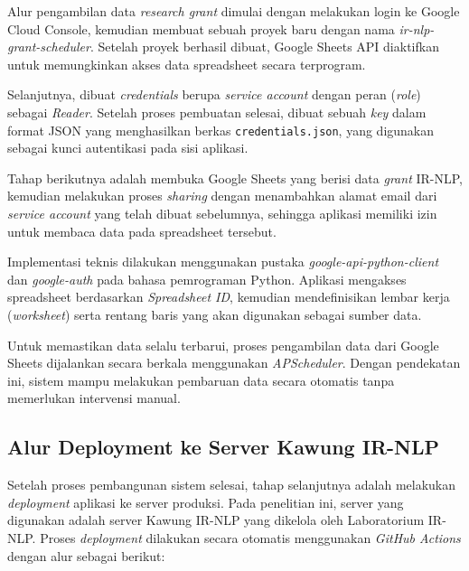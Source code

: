 Alur pengambilan data \textit{research grant} dimulai dengan melakukan login ke Google Cloud Console, kemudian membuat sebuah proyek baru dengan nama \textit{ir-nlp-grant-scheduler}. Setelah proyek berhasil dibuat, Google Sheets API diaktifkan untuk memungkinkan akses data spreadsheet secara terprogram.

Selanjutnya, dibuat \textit{credentials} berupa \textit{service account} dengan peran (\textit{role}) sebagai \textit{Reader}. Setelah proses pembuatan selesai, dibuat sebuah \textit{key} dalam format JSON yang menghasilkan berkas \texttt{credentials.json}, yang digunakan sebagai kunci autentikasi pada sisi aplikasi.

Tahap berikutnya adalah membuka Google Sheets yang berisi data \textit{grant} IR-NLP, kemudian melakukan proses \textit{sharing} dengan menambahkan alamat email dari \textit{service account} yang telah dibuat sebelumnya, sehingga aplikasi memiliki izin untuk membaca data pada spreadsheet tersebut.

Implementasi teknis dilakukan menggunakan pustaka \textit{google-api-python-client} dan \textit{google-auth} pada bahasa pemrograman Python. Aplikasi mengakses spreadsheet berdasarkan \textit{Spreadsheet ID}, kemudian mendefinisikan lembar kerja (\textit{worksheet}) serta rentang baris yang akan digunakan sebagai sumber data.

Untuk memastikan data selalu terbarui, proses pengambilan data dari Google Sheets dijalankan secara berkala menggunakan \textit{APScheduler}. Dengan pendekatan ini, sistem mampu melakukan pembaruan data secara otomatis tanpa memerlukan intervensi manual.


\subsection{Alur Deployment ke Server Kawung IR-NLP}

Setelah proses pembangunan sistem selesai, tahap selanjutnya adalah melakukan \textit{deployment} aplikasi ke server produksi. Pada penelitian ini, server yang digunakan adalah server Kawung IR-NLP yang dikelola oleh Laboratorium IR-NLP. Proses \textit{deployment} dilakukan secara otomatis menggunakan \textit{GitHub Actions} dengan alur sebagai berikut:

